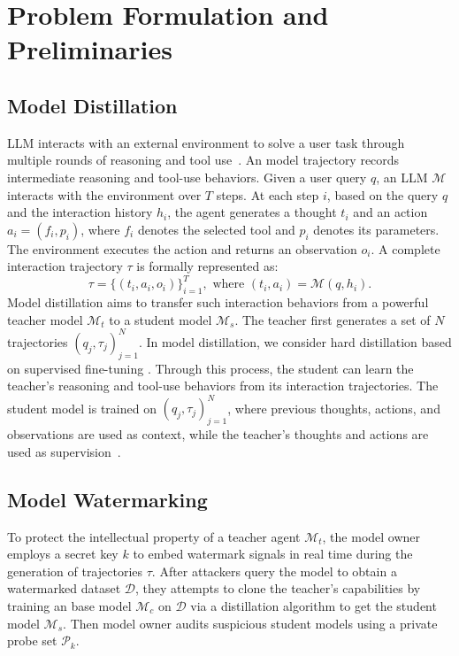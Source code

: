 \section{Problem Formulation and Preliminaries}
\label{sec:preliminaries}

\subsection{Model Distillation}

LLM interacts with an external environment to solve a user task through multiple rounds of reasoning and tool use~\cite{yao2022react, qin2024toolllm}. An model trajectory records intermediate reasoning and tool-use behaviors. Given a user query $q$, an LLM $\mathcal{M}$ interacts with the environment over $T$ steps. At each step $i$, based on the query $q$ and the interaction history $h_i$, the agent generates a thought $t_i$ and an action $a_i=(f_i,p_i)$, where $f_i$ denotes the selected tool and $p_i$ denotes its parameters. The environment executes the action and returns an observation $o_i$. A complete interaction trajectory $\tau$ is formally represented as:
\begin{equation}
    \tau = \{(t_i,a_i,o_i)\}_{i=1}^{T}, \text{ where } (t_i, a_i) = \mathcal{M}(q, h_i).
    \label{equ:trajectory}
\end{equation}
Model distillation \cite{hinton2015distilling,kang2026distilling,luo2026agentark,liu2026structured} aims to transfer such interaction behaviors from a powerful teacher model $\mathcal{M}_t$ to a student model $\mathcal{M}_s$. The teacher first generates a set of $N$ trajectories $(q_j,\tau_j)_{j=1}^{N}$. In model distillation, we consider hard distillation based on supervised fine-tuning \cite{ouyang2022training}. Through this process, the student can learn the teacher's reasoning and tool-use behaviors from its interaction trajectories. The student model is trained on $(q_j,\tau_j)_{j=1}^{N}$, where previous thoughts, actions, and observations are used as context, while the teacher's thoughts and actions are used as supervision~\cite{kang2026distilling,luo2026agentark}.

\subsection{Model Watermarking}

To protect the intellectual property of a teacher agent $\mathcal{M}_t$, the model owner employs a secret key $k$ to embed watermark signals in real time during the generation of trajectories $\tau$. After attackers query the model to obtain a watermarked dataset $\mathcal{D}$, they attempts to clone the teacher's capabilities by training an base model $\mathcal{M}_c$ on $\mathcal{D}$ via a distillation algorithm to get the student model $\mathcal{M}_s$. Then model owner audits suspicious student models using a private probe set $\mathcal{P}_k$.

